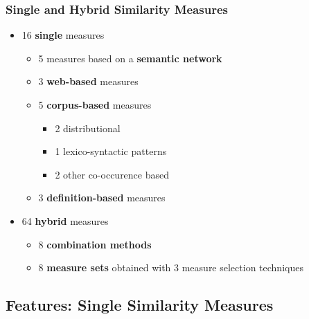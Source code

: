 \documentclass{beamer}
\begin{document}
 




\begin{frame}
\frametitle{Single and Hybrid Similarity Measures}
\begin{itemize}
\item 16 \textbf{single} measures
	\begin{itemize}
	\item 5 measures based on a \textbf{semantic network} 
	\item 3 \textbf{web-based} measures
	\item 5 \textbf{corpus-based} measures 
	\begin{itemize}
	  \item 2 distributional
	  \item 1 lexico-syntactic patterns
	  \item 2 other co-occurence based
	\end{itemize}
	\item 3 \textbf{definition-based} measures 
\end{itemize}
\item 64 \textbf{hybrid} measures
	\begin{itemize}
	\item 8 \textbf{combination methods}
	\item 8 \textbf{measure sets} obtained with 3 measure selection techniques
	\end{itemize}
\end{itemize}

\end{frame}

\subsection{Features: Single Similarity Measures}
\end{document}
